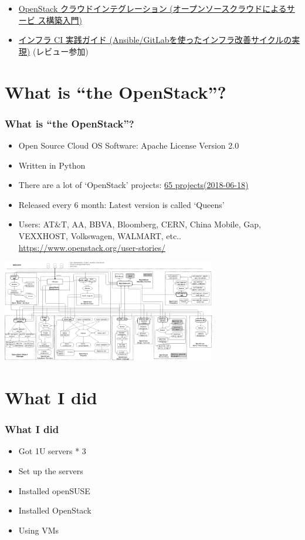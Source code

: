 \documentclass[aspectratio=169,11pt,hyperref={colorlinks=true}]{beamer}
\begin{document}
\begin{frame}
\begin{itemize}
      \begin{itemize}
      \item \href{https://www.amazon.co.jp/dp/4798139785/}{OpenStack
        クラウドインテグレーション (オープンソースクラウドによるサービ
        ス構築入門)}
      \item \href{https://www.amazon.co.jp/dp/4798155128/}{インフラ CI
        実践ガイド (Ansible/GitLabを使ったインフラ改善サイクルの実
        現)} (レビュー参加)
      \end{itemize}
  \end{itemize}
\end{frame}

\section{What is ``the OpenStack''?}
\begin{frame}
  \frametitle{What is ``the OpenStack''?}
  \begin{itemize}
    \item Open Source Cloud OS Software: Apache License Version 2.0
    \item Written in Python
    \item There are a lot of `OpenStack' projects: \href{http://governance.openstack.org/reference/projects/index.html}{65 projects(2018-06-18)}
    \item Released every 6 month: Latest version is called `Queens'
    \item Users: \scriptsize{AT\&T, AA, BBVA, Bloomberg, CERN,
      China Mobile, Gap, VEXXHOST,
      Volkswagen, WALMART, etc.. \url{https://www.openstack.org/user-stories/}}
  \end{itemize}
  \begin{center}
    \includegraphics[width=0.7\textwidth]{openstack-arch-kilo-logical-v1.png}
  \end{center}
\end{frame}

\section{What I did}
\begin{frame}
  \frametitle{What I did}
  \begin{itemize}
    \item Got 1U servers * 3
    \item Set up the servers
    \item Installed openSUSE
    \item Installed OpenStack
    \item Using VMs
  \end{itemize}
\end{frame}
\end{document}
